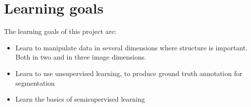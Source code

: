 \documentclass{article}
\begin{document}

\section{Learning goals}
The learning goals of this project are:
\begin{itemize}
    \item Learn to manipulate data in several dimensions where structure is important.
    Both in two and in three image dimensions.
    \item Learn to use unsupervised learning, to produce ground truth annotation for segmentation
    \item Learn the basics of semisupervised learning
    
\end{itemize}
\end{document}
